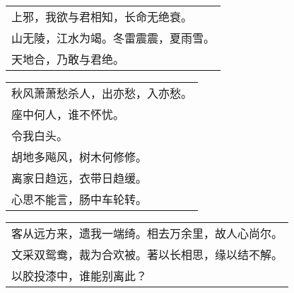 \nopagebreak%
\nopagebreak%
\noindent\begin{minipage}{\linewidth}
  \vskip-3pt\begin{table}[H]
    \centering
    \begin{tabular}{@{}l@{}}
上邪，我欲与君相知，长命无绝衰。\\
山无陵，江水为竭。冬雷震震，夏雨雪。\\
天地合，乃敢与君绝。
    \end{tabular}
  \end{table}
\end{minipage}
\vspace{1cm}


\nopagebreak%
\nopagebreak%
\noindent\begin{minipage}{\linewidth}
  \vskip-3pt\begin{table}[H]
    \centering
    \begin{tabular}{@{}l@{}}
秋风萧萧愁杀人，出亦愁，入亦愁。\\
座中何人，谁不怀忧。\\
令我白头。\\
胡地多飚风，树木何修修。\\
离家日趋远，衣带日趋缓。\\
心思不能言，肠中车轮转。
    \end{tabular}
  \end{table}
\end{minipage}
\vspace{1cm}


\nopagebreak%
\nopagebreak%
\noindent\begin{minipage}{\linewidth}
  \vskip-3pt\begin{table}[H]
    \centering
    \begin{tabular}{@{}l@{}}
客从远方来，遗我一端绮。相去万余里，故人心尚尔。\\
文采双鸳鸯，裁为合欢被。著以长相思，缘以结不解。\\
以胶投漆中，谁能别离此？
    \end{tabular}
  \end{table}
\end{minipage}
\vspace{1cm}


